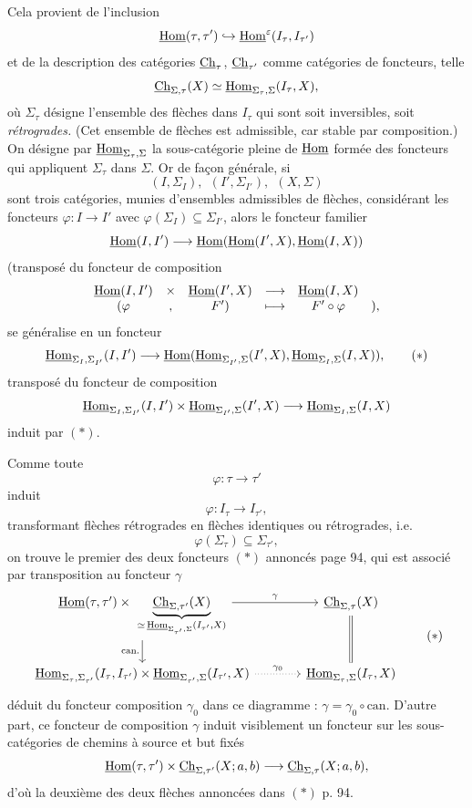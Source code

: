 Cela provient de l'inclusion
\[
\underline{\mathrm{Hom}}(\tau,\tau')\hookrightarrow\underline{\mathrm{Hom}}^{\varepsilon}(I_\tau,I_{\tau'})
\]
et de la description des catégories $\underline{\mathrm{Ch}}_\tau$, $\underline{\mathrm{Ch}}_{\tau'}$ comme catégories de foncteurs, telle
\[
\underline{\mathrm{Ch}}_{\Sigma,\tau}(X)\simeq\underline{\mathrm{Hom}}_{\Sigma_\tau,\Sigma}(I_\tau,X),
\]
où $\Sigma_\tau$ désigne l'ensemble des flèches dans $I_\tau$ qui sont soit inversibles, soit \textit{rétrogrades.} (Cet ensemble de flèches est admissible, car stable par composition.) On désigne par $\underline{\mathrm{Hom}}_{\Sigma_\tau,\Sigma}$ la sous-catégorie pleine de $\underline{\mathrm{Hom}}$ formée des foncteurs qui appliquent $\Sigma_\tau$ dans $\Sigma$. Or de façon générale, si
\[
(I,\Sigma_I),\ \ (I',\Sigma_{I'}),\ \ (X,\Sigma)
\]
sont trois catégories, munies d'ensembles admissibles de flèches, considérant les foncteurs $\varphi:I\longrightarrow I'$ avec $\varphi(\Sigma_I)\subseteq\Sigma_{I'}$, alors le foncteur familier
\[
\underline{\mathrm{Hom}}(I,I')\longrightarrow\underline{\mathrm{Hom}}(\underline{\mathrm{Hom}}(I',X),\underline{\mathrm{Hom}}(I,X))
\]
(transposé du foncteur de composition
\[
\begin{matrix}
\underline{\mathrm{Hom}}(I,I') & \times & \underline{\mathrm{Hom}}(I',X) & \longrightarrow & \underline{\mathrm{Hom}}(I,X) & \\
(\varphi & , & F') & \longmapsto & F'\circ\varphi & ),
\end{matrix}
\]
se généralise en un foncteur
\[
\underline{\mathrm{Hom}}_{\Sigma_I,\Sigma_{I'}}(I,I')\longrightarrow\underline{\mathrm{Hom}}(\underline{\mathrm{Hom}}_{\Sigma_{I'},\Sigma}(I',X),\underline{\mathrm{Hom}}_{\Sigma_I,\Sigma}(I,X)),
\tag*{$(*)$}
\]
transposé du foncteur de composition
\[
\underline{\mathrm{Hom}}_{\Sigma_I,\Sigma_{I'}}(I,I')\times\underline{\mathrm{Hom}}_{\Sigma_{I'},\Sigma}(I',X)\longrightarrow\underline{\mathrm{Hom}}_{\Sigma_I,\Sigma}(I,X)
\]
induit par $(*)$.


Comme toute
\[
\varphi:\tau\longrightarrow\tau'
\]
induit
\[
\varphi:I_\tau\longrightarrow I_{\tau'},
\]
transformant flèches rétrogrades en flèches identiques ou rétrogrades, i.e.
\[
\varphi(\Sigma_\tau)\subseteq\Sigma_{\tau'},
\]
on trouve le premier des deux foncteurs $(*)$ annoncés page 94, qui est associé par transposition au foncteur $\gamma$
\[
\begin{tikzcd}[column sep=large]
\uHom(\tau,\tau')\times\ \underbrace{\uCh_{\Sigma,\tau'}(X)}_{\simeq\,\uHom_{\Sigma_{\tau'},\Sigma}(I_{\tau'},X)} \arrow[r, "\gamma"] \arrow[d, "\text{can.}"'] & \uCh_{\Sigma,\tau}(X) \arrow[d, equal]\\
\uHom_{\Sigma_\tau,\Sigma_{\tau'}}(I_\tau,I_{\tau'})\times\uHom_{\Sigma_{\tau'},\Sigma}(I_{\tau'},X) \arrow[r, dotted, "\gamma_0"] & \uHom_{\Sigma_\tau,\Sigma}(I_\tau,X)
\end{tikzcd}
\tag*{$(*)$}
\]
déduit du foncteur composition $\gamma_0$ dans ce diagramme : $\gamma=\gamma_0\circ\mathrm{can}.$ D'autre part, ce foncteur de composition $\gamma$ induit visiblement un foncteur sur les sous-catégories de chemins à source et but fixés
\[
\underline{\mathrm{Hom}}(\tau,\tau')\times\underline{\mathrm{Ch}}_{\Sigma,\tau'}(X;a,b)\longrightarrow\underline{\mathrm{Ch}}_{\Sigma,\tau}(X;a,b),
\]
d'où la deuxième des deux flèches annoncées dans $(*)$ p. 94.

